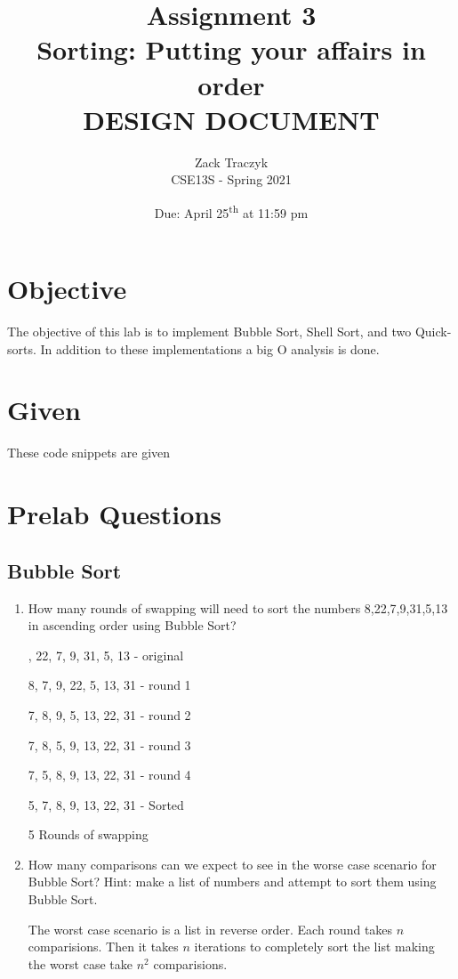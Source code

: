 \documentclass[12pt]{article}
\title{%
	\textbf{Assignment 3 \\ 
	Sorting: Putting your affairs in order \\
	\large DESIGN DOCUMENT}}
\author{Zack Traczyk \\ CSE13S - Spring 2021}
\date{Due: April 25\textsuperscript{th} at 11:59 pm}
\newenvironment{QandA}{\begin{enumerate}[label=\bfseries\alph*.]\bfseries}
                      {\end{enumerate}}
\newenvironment{answered}{\par\normalfont}{}
\begin{document}
\maketitle

\section{Objective}

The objective of this lab is to implement Bubble Sort, Shell Sort, and two Quick-sorts. In addition to these implementations a big O analysis is done.

\section{Given}

These code snippets are given

\section{Prelab Questions}

\subsection{Bubble Sort}
\begin{QandA}

	\item How many rounds of swapping will need to sort the numbers 8,22,7,9,31,5,13 in ascending order using Bubble Sort?
		\begin{answered}
			8, 22, 7, 9, 31, 5, 13 - original

			8, 7, 9, 22, 5, 13, 31 - round 1

			7, 8, 9, 5, 13, 22, 31 - round 2

			7, 8, 5, 9, 13, 22, 31 - round 3

			7, 5, 8, 9, 13, 22, 31 - round 4

			5, 7, 8, 9, 13, 22, 31 - Sorted

			5 Rounds of swapping
		\end{answered}

	\item How many comparisons can we expect to see in the worse case scenario for Bubble Sort? Hint: make a list of numbers and attempt to sort them using Bubble Sort.

		\begin{answered}
			The worst case scenario is a list in reverse order. Each round takes $n$ comparisions. Then it takes $n$ iterations to completely sort the list making the worst case take $n^2$ comparisions.
		\end{answered}
\end{QandA}
\end{document}
